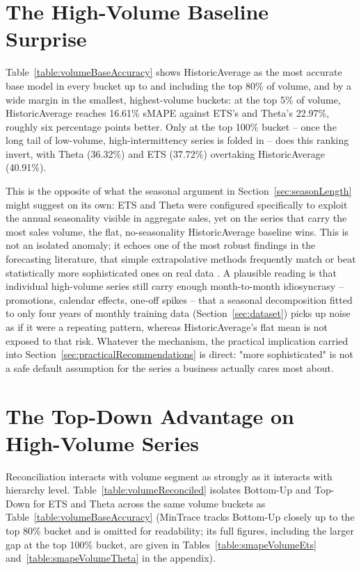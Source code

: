 \section{The High-Volume Baseline Surprise}
\label{sec:highVolumeBaselineSurprise}

Table~\ref{table:volumeBaseAccuracy} shows HistoricAverage as the most accurate base model in every bucket up to and including the top 80\% of volume, and by a wide margin in the smallest, highest-volume buckets: at the top 5\% of volume, HistoricAverage reaches 16.61\% sMAPE against ETS's and Theta's 22.97\%, roughly six percentage points better. Only at the top 100\% bucket -- once the long tail of low-volume, high-intermittency series is folded in -- does this ranking invert, with Theta (36.32\%) and ETS (37.72\%) overtaking HistoricAverage (40.91\%).

This is the opposite of what the seasonal argument in Section~\ref{sec:seasonLength} might suggest on its own: ETS and Theta were configured specifically to exploit the annual seasonality visible in aggregate sales, yet on the series that carry the most sales volume, the flat, no-seasonality HistoricAverage baseline wins. This is not an isolated anomaly; it echoes one of the most robust findings in the forecasting literature, that simple extrapolative methods frequently match or beat statistically more sophisticated ones on real data \cite{MakridakisHibon:2000}. A plausible reading is that individual high-volume series still carry enough month-to-month idiosyncrasy -- promotions, calendar effects, one-off spikes -- that a seasonal decomposition fitted to only four years of monthly training data (Section~\ref{sec:dataset}) picks up noise as if it were a repeating pattern, whereas HistoricAverage's flat mean is not exposed to that risk. Whatever the mechanism, the practical implication carried into Section~\ref{sec:practicalRecommendations} is direct: "more sophisticated" is not a safe default assumption for the series a business actually cares most about.

\section{The Top-Down Advantage on High-Volume Series}
\label{sec:topDownAdvantage}

Reconciliation interacts with volume segment as strongly as it interacts with hierarchy level. Table~\ref{table:volumeReconciled} isolates Bottom-Up and Top-Down for ETS and Theta across the same volume buckets as Table~\ref{table:volumeBaseAccuracy} (MinTrace tracks Bottom-Up closely up to the top 80\% bucket and is omitted for readability; its full figures, including the larger gap at the top 100\% bucket, are given in Tables~\ref{table:smapeVolumeEts} and~\ref{table:smapeVolumeTheta} in the appendix).

